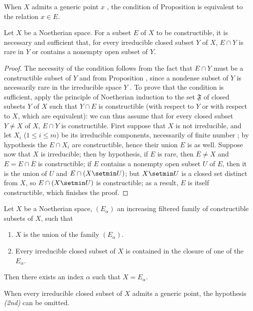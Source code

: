 When $X$ admits a generic point $x$ , the condition of Proposition  is equivalent to the relation $x\in E$.

\begin{proposition}[9.2.3]
\label{0.9.2.3}
Let $X$ be a Noetherian space.
For a subset $E$ of $X$ to be constructible, it is necessary and sufficient that, for every irreducible closed subset $Y$ of $X$, $E\cap Y$ is rare in $Y$ or contains a nonempty open subset of $Y$.
\end{proposition}

\begin{proof}
The necessity of the condition follows from the fact that $E\cap Y$ must be a constructible subset of $Y$ and from Proposition , since a nondense subset of $Y$ is necessarily rare in the irreducible space $Y$ .
To prove that the condition is sufficient, apply the principle of Noetherian induction  to the set $\mathfrak{F}$ of closed subsets $Y$ of $X$ such that $Y\cap E$ is constructible (with respect to $Y$ or with respect to $X$, which are equivalent): we can thus assume that for every closed subset $Y\neq X$ of $X$, $E\cap Y$ is constructible.
First suppose that $X$ is not irreducible, and let $X_i$ ($1\leq i\leq m$) be its irreducible components, necessarily of finite number ; by hypothesis the $E\cap X_i$ are constructible, hence their union $E$ is as well.
Suppose now that $X$ is irreducible; then by hypothesis, if $E$ is rare, then $\overline{E}\neq X$ and $E=E\cap\overline{E}$ is constructible; if $E$ contains a nonempty open subset $U$ of $E$, then it is the union of $U$ and $E\cap(X\setmin U)$; but $X\setmin U$ is a closed set distinct from $X$, so $E\cap(X\setmin U)$ is constructible; as a result, $E$ is itself constructible, which finishes the proof.
\end{proof}

\begin{corollary}[9.2.4]
\label{0.9.2.4}
Let $X$ be a Noetherian space, $(E_\alpha)$ an increasing filtered family of constructible subsets of $X$, such that
\begin{enumerate}
  \item[\emph{(1st)}] $X$ is the union of the family $(E_\alpha)$.
  \item[\emph{(2nd)}] Every irreducible closed subset of $X$ is contained in the closure of one of the $E_\alpha$.
\end{enumerate}

Then there exists an index $\alpha$ such that $X=E_\alpha$.

When every irreducible closed subset of $X$ admits a generic point, the hypothesis \emph{(2nd)} can be omitted.
\end{corollary}

